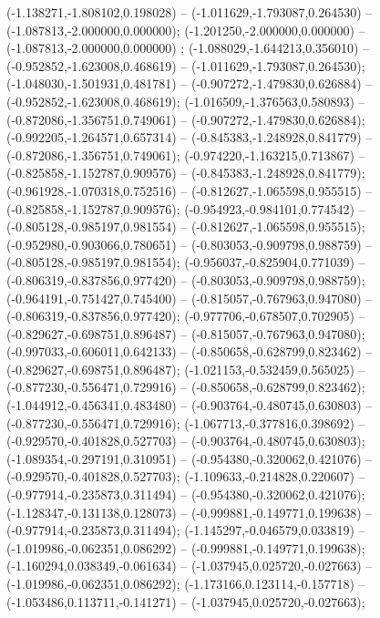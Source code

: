  (-1.138271,-1.808102,0.198028) -- (-1.011629,-1.793087,0.264530) -- (-1.087813,-2.000000,0.000000);
 (-1.201250,-2.000000,0.000000) -- (-1.087813,-2.000000,0.000000) ;
 (-1.088029,-1.644213,0.356010) -- (-0.952852,-1.623008,0.468619) -- (-1.011629,-1.793087,0.264530);
 (-1.048030,-1.501931,0.481781) -- (-0.907272,-1.479830,0.626884) -- (-0.952852,-1.623008,0.468619);
 (-1.016509,-1.376563,0.580893) -- (-0.872086,-1.356751,0.749061) -- (-0.907272,-1.479830,0.626884);
 (-0.992205,-1.264571,0.657314) -- (-0.845383,-1.248928,0.841779) -- (-0.872086,-1.356751,0.749061);
 (-0.974220,-1.163215,0.713867) -- (-0.825858,-1.152787,0.909576) -- (-0.845383,-1.248928,0.841779);
 (-0.961928,-1.070318,0.752516) -- (-0.812627,-1.065598,0.955515) -- (-0.825858,-1.152787,0.909576);
 (-0.954923,-0.984101,0.774542) -- (-0.805128,-0.985197,0.981554) -- (-0.812627,-1.065598,0.955515);
 (-0.952980,-0.903066,0.780651) -- (-0.803053,-0.909798,0.988759) -- (-0.805128,-0.985197,0.981554);
 (-0.956037,-0.825904,0.771039) -- (-0.806319,-0.837856,0.977420) -- (-0.803053,-0.909798,0.988759);
 (-0.964191,-0.751427,0.745400) -- (-0.815057,-0.767963,0.947080) -- (-0.806319,-0.837856,0.977420);
 (-0.977706,-0.678507,0.702905) -- (-0.829627,-0.698751,0.896487) -- (-0.815057,-0.767963,0.947080);
 (-0.997033,-0.606011,0.642133) -- (-0.850658,-0.628799,0.823462) -- (-0.829627,-0.698751,0.896487);
 (-1.021153,-0.532459,0.565025) -- (-0.877230,-0.556471,0.729916) -- (-0.850658,-0.628799,0.823462);
 (-1.044912,-0.456341,0.483480) -- (-0.903764,-0.480745,0.630803) -- (-0.877230,-0.556471,0.729916);
 (-1.067713,-0.377816,0.398692) -- (-0.929570,-0.401828,0.527703) -- (-0.903764,-0.480745,0.630803);
 (-1.089354,-0.297191,0.310951) -- (-0.954380,-0.320062,0.421076) -- (-0.929570,-0.401828,0.527703);
 (-1.109633,-0.214828,0.220607) -- (-0.977914,-0.235873,0.311494) -- (-0.954380,-0.320062,0.421076);
 (-1.128347,-0.131138,0.128073) -- (-0.999881,-0.149771,0.199638) -- (-0.977914,-0.235873,0.311494);
 (-1.145297,-0.046579,0.033819) -- (-1.019986,-0.062351,0.086292) -- (-0.999881,-0.149771,0.199638);
 (-1.160294,0.038349,-0.061634) -- (-1.037945,0.025720,-0.027663) -- (-1.019986,-0.062351,0.086292);
 (-1.173166,0.123114,-0.157718) -- (-1.053486,0.113711,-0.141271) -- (-1.037945,0.025720,-0.027663);
